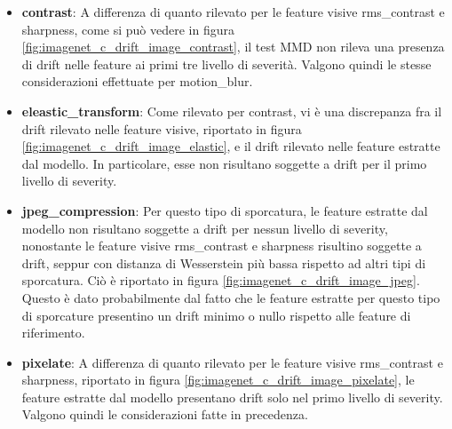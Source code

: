 \begin{itemize}
  \item \textbf{contrast}: A differenza di quanto rilevato per le feature visive rms\_contrast e sharpness, come si può vedere in figura \ref{fig:imagenet_c_drift_image_contrast}, il test MMD non rileva una presenza di drift nelle feature ai primi tre livello di severità. Valgono quindi le stesse considerazioni effettuate per motion\_blur.
  \item \textbf{eleastic\_transform}: Come rilevato per contrast, vi è una discrepanza fra il drift rilevato nelle feature visive, riportato in figura \ref{fig:imagenet_c_drift_image_elastic}, e il drift rilevato nelle feature estratte dal modello. In particolare, esse non risultano soggette a drift per il primo livello di severity.
  \item \textbf{jpeg\_compression}: Per questo tipo di sporcatura, le feature estratte dal modello non risultano soggette a drift per nessun livello di severity, nonostante le feature visive rms\_contrast e sharpness risultino soggette a drift, seppur con distanza di Wesserstein più bassa rispetto ad altri tipi di sporcatura. Ciò è riportato in figura \ref{fig:imagenet_c_drift_image_jpeg}. Questo è dato probabilmente dal fatto che le feature estratte per questo tipo di sporcature presentino un drift minimo o nullo rispetto alle feature di riferimento.
  \item \textbf{pixelate}: A differenza di quanto rilevato per le feature visive rms\_contrast e sharpness, riportato in figura \ref{fig:imagenet_c_drift_image_pixelate}, le feature estratte dal modello presentano drift solo nel primo livello di severity. Valgono quindi le considerazioni fatte in precedenza.
\end{itemize}
